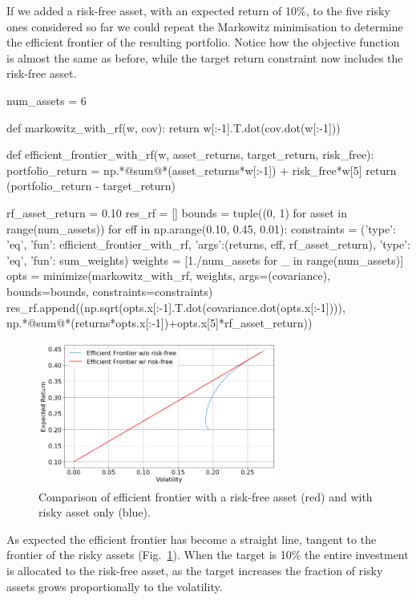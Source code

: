 If we added a risk-free asset, with an expected return of 10\%, to the five risky ones considered so far we could repeat the Markowitz minimisation to determine the efficient frontier of the resulting portfolio. Notice how the objective function is almost the same as before, while the target return constraint now includes the risk-free asset.

\begin{ipython}
num_assets = 6

def markowitz_with_rf(w, cov):
    return w[:-1].T.dot(cov.dot(w[:-1]))

def efficient_frontier_with_rf(w, asset_returns, target_return, risk_free):
    portfolio_return = np.*@sum@*(asset_returns*w[:-1]) + risk_free*w[5]
    return (portfolio_return - target_return)

rf_asset_return = 0.10
res_rf = []
bounds = tuple((0, 1) for asset in range(num_assets))
for eff in np.arange(0.10, 0.45, 0.01):
    constraints = ({'type': 'eq', 'fun': efficient_frontier_with_rf,
	                'args':(returns, eff, rf_asset_return)},
                   {'type': 'eq', 'fun': sum_weights})
    weights = [1./num_assets for _ in range(num_assets)]
    opts = minimize(markowitz_with_rf, weights, args=(covariance),
                    bounds=bounds, constraints=constraints)
    res_rf.append((np.sqrt(opts.x[:-1].T.dot(covariance.dot(opts.x[:-1]))),
                   np.*@sum@*(returns*opts.x[:-1])+opts.x[5]*rf_asset_return))
\end{ipython}

\begin{figure}[htb]
\centering
\includegraphics[width=0.7\textwidth]{figures/cal}
\caption{Comparison of efficient frontier with a risk-free asset (red) and with risky asset only (blue).}
\label{fig:cal}
\end{figure}
    
As expected the efficient frontier has become a straight line, tangent to the frontier of the risky assets (Fig.~\ref{fig:cal}). When the target is 10\% the entire investment is allocated to the risk-free asset, as the target increases the fraction of risky assets grows proportionally to the volatility. 

